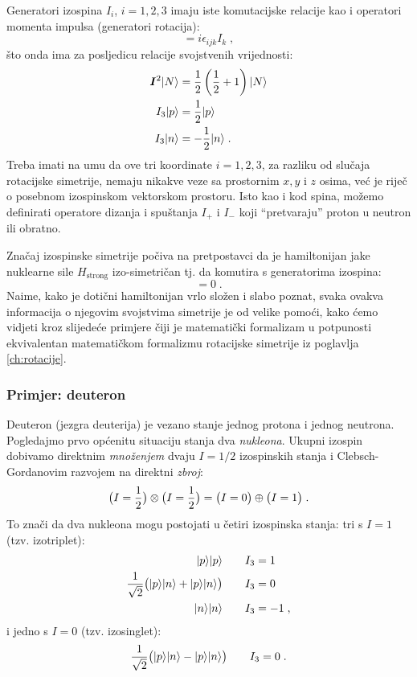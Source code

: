 Generatori izospina $I_i$, $i=1,2,3$ imaju iste komutacijske relacije
kao i operatori momenta impulsa (generatori rotacija):
\begin{equation}
  [I_i, I_j] = i \epsilon_{ijk} I_k  \;,
\end{equation}
što onda ima za posljedicu relacije svojstvenih vrijednosti:
\begin{align}
\vec{I}^2 \ket{N} &= \fhalf \left(\fhalf +1\right)  \ket{N} \\
I_3 \ket{p} &= \fhalf  \ket{p} \\
I_3 \ket{n} &= - \fhalf  \ket{n} \;.
\end{align}
Treba imati na umu da ove tri koordinate $i=1,2,3$, za razliku od
slučaja rotacijske simetrije, nemaju nikakve veze sa prostornim
$x, y$ i $z$ osima, već je riječ o posebnom izospinskom vektorskom prostoru.
Isto kao i kod spina, možemo definirati operatore dizanja i
spuštanja $I_+$ i $I_-$ koji ``pretvaraju'' proton u neutron 
ili obratno.

Značaj izospinske simetrije počiva na pretpostavci da je hamiltonijan
jake nuklearne sile $H_{\text{strong}}$ izo-simetričan tj. da komutira
s generatorima izospina:
\begin{equation}
   [H_{\text{strong}}, I_i] = 0 \;.
\end{equation}
Naime, kako je dotični hamiltonijan vrlo složen i slabo poznat, svaka
ovakva informacija o njegovim svojstvima simetrije je od velike
pomoći, kako ćemo vidjeti kroz slijedeće primjere čiji je matematički
formalizam u potpunosti ekvivalentan matematičkom formalizmu
rotacijske simetrije iz poglavlja \ref{ch:rotacije}.

\subsubsection*{Primjer: deuteron}

Deuteron (jezgra deuterija) je vezano stanje jednog protona i jednog
neutrona. Pogledajmo prvo općenitu situaciju stanja dva
\emph{nukleona}. Ukupni izospin dobivamo direktnim \emph{množenjem}
dvaju $I=1/2$ izospinskih stanja i Clebsch-Gordanovim razvojem na
direktni \emph{zbroj}:
\begin{equation}
 \big(I=\frac{1}{2}\big) \otimes  \big(I=\frac{1}{2}\big) = 
\big(I=0\big) \oplus \big(I=1\big) \;.
\end{equation}
To znači da dva nukleona mogu postojati u četiri izospinska stanja:
tri s $I=1$ (tzv. izotriplet):
\begin{align}
  | p \rangle| p \rangle \qquad & I_3 = 1 \\
  \frac{1}{\sqrt{2}} \big( | p \rangle| n \rangle+| p \rangle| n \rangle\big)
  \qquad & I_3 = 0 \\
  | n \rangle| n \rangle \qquad & I_3 = -1 \;,
\end{align}
i jedno s $I=0$ (tzv. izosinglet):
\begin{equation}
  \frac{1}{\sqrt{2}} \big( | p \rangle| n \rangle-| p \rangle| n \rangle\big)                    \qquad  I_3 = 0 \;.
\label{izosinglet}
\end{equation}


